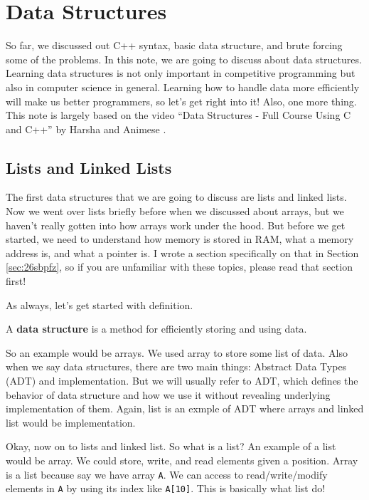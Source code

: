 \documentclass[../../../main.tex]{subfiles}
\begin{document}
\chapter{Data Structures}

So far, we discussed out C++ syntax, basic data structure, and
brute forcing some of the problems. In this note, we are going to
discuss about data structures. Learning data structures is not only
important in competitive programming but also in computer science
in general. Learning how to handle data more efficiently will make
us better programmers, so let's get right into it! Also, one more
thing. This note is largely based on the video ``Data Structures -
Full Course Using C and C++'' by Harsha and Animese \cite{CS02-9}.

\section{Lists and Linked Lists}

The first data structures that we are going to discuss are lists
and linked lists. Now we went over lists briefly before when we
discussed about arrays, but we haven't really gotten into how
arrays work under the hood. But before we get started, we need to
understand how memory is stored in RAM, what a memory address is,
and what a pointer is. I wrote a section specifically on that in
Section \ref{sec:26sbpfz}, so if you are unfamiliar with these topics,
please read that section first!

As always, let's get started with definition.

\begin{definition}{}{}
A \textbf{data structure} is a method for efficiently storing and
using data.
\end{definition}

So an example would be arrays. We used array to store some list of
data. Also when we say data structures, there are two main things:
Abstract Data Types (ADT) and implementation. But we will usually
refer to ADT, which defines the behavior of data structure and how
we use it without revealing underlying implementation of them.
Again, list is an exmple of ADT where arrays and linked list would
be implementation.

Okay, now on to lists and linked list. So what is a list? An example
of a list would be array. We could store, write, and read elements
given a position. Array is a list because say we have array
\verb|A|. We can access to read/write/modify elements in \verb|A| by
using its index like \verb|A[10]|. This is basically what list do!
\end{document}
